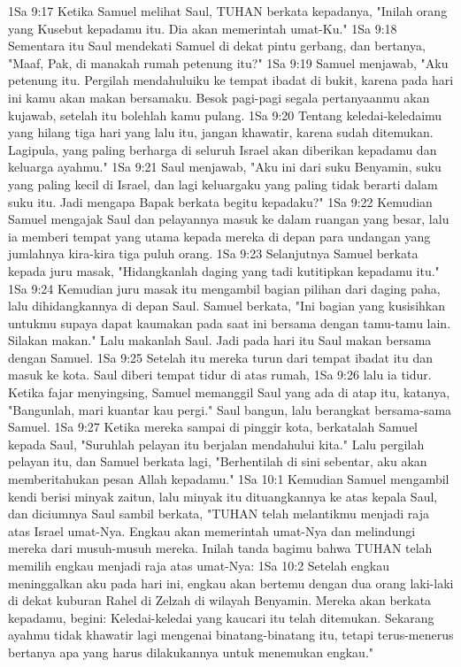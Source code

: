 1Sa 9:17  Ketika Samuel melihat Saul, TUHAN berkata kepadanya, "Inilah orang yang Kusebut kepadamu itu. Dia akan memerintah umat-Ku."
1Sa 9:18  Sementara itu Saul mendekati Samuel di dekat pintu gerbang, dan bertanya, "Maaf, Pak, di manakah rumah petenung itu?"
1Sa 9:19  Samuel menjawab, "Aku petenung itu. Pergilah mendahuluiku ke tempat ibadat di bukit, karena pada hari ini kamu akan makan bersamaku. Besok pagi-pagi segala pertanyaanmu akan kujawab, setelah itu bolehlah kamu pulang.
1Sa 9:20  Tentang keledai-keledaimu yang hilang tiga hari yang lalu itu, jangan khawatir, karena sudah ditemukan. Lagipula, yang paling berharga di seluruh Israel akan diberikan kepadamu dan keluarga ayahmu."
1Sa 9:21  Saul menjawab, "Aku ini dari suku Benyamin, suku yang paling kecil di Israel, dan lagi keluargaku yang paling tidak berarti dalam suku itu. Jadi mengapa Bapak berkata begitu kepadaku?"
1Sa 9:22  Kemudian Samuel mengajak Saul dan pelayannya masuk ke dalam ruangan yang besar, lalu ia memberi tempat yang utama kepada mereka di depan para undangan yang jumlahnya kira-kira tiga puluh orang.
1Sa 9:23  Selanjutnya Samuel berkata kepada juru masak, "Hidangkanlah daging yang tadi kutitipkan kepadamu itu."
1Sa 9:24  Kemudian juru masak itu mengambil bagian pilihan dari daging paha, lalu dihidangkannya di depan Saul. Samuel berkata, "Ini bagian yang kusisihkan untukmu supaya dapat kaumakan pada saat ini bersama dengan tamu-tamu lain. Silakan makan." Lalu makanlah Saul. Jadi pada hari itu Saul makan bersama dengan Samuel.
1Sa 9:25  Setelah itu mereka turun dari tempat ibadat itu dan masuk ke kota. Saul diberi tempat tidur di atas rumah,
1Sa 9:26  lalu ia tidur. Ketika fajar menyingsing, Samuel memanggil Saul yang ada di atap itu, katanya, "Bangunlah, mari kuantar kau pergi." Saul bangun, lalu berangkat bersama-sama Samuel.
1Sa 9:27  Ketika mereka sampai di pinggir kota, berkatalah Samuel kepada Saul, "Suruhlah pelayan itu berjalan mendahului kita." Lalu pergilah pelayan itu, dan Samuel berkata lagi, "Berhentilah di sini sebentar, aku akan memberitahukan pesan Allah kepadamu."
1Sa 10:1  Kemudian Samuel mengambil kendi berisi minyak zaitun, lalu minyak itu dituangkannya ke atas kepala Saul, dan diciumnya Saul sambil berkata, "TUHAN telah melantikmu menjadi raja atas Israel umat-Nya. Engkau akan memerintah umat-Nya dan melindungi mereka dari musuh-musuh mereka. Inilah tanda bagimu bahwa TUHAN telah memilih engkau menjadi raja atas umat-Nya:
1Sa 10:2  Setelah engkau meninggalkan aku pada hari ini, engkau akan bertemu dengan dua orang laki-laki di dekat kuburan Rahel di Zelzah di wilayah Benyamin. Mereka akan berkata kepadamu, begini: Keledai-keledai yang kaucari itu telah ditemukan. Sekarang ayahmu tidak khawatir lagi mengenai binatang-binatang itu, tetapi terus-menerus bertanya apa yang harus dilakukannya untuk menemukan engkau."
